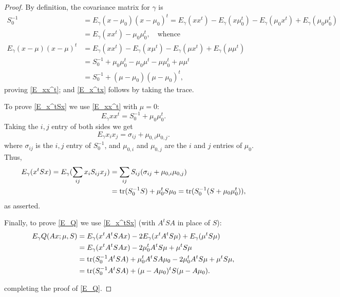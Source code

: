 \documentclass[12pt,leqno]{article}
\begin{document}
  \begin{proof}
    By definition, the covariance matrix for $\gamma$ is
    \begin{align*}
    S_0^{-1} &= E_{\gamma}(x-\mu_0)(x-\mu_0)^t = E_{\gamma}(xx^t) - E_{\gamma}(x\mu_0^t) - E_{\gamma}(\mu_0{x}^t) + E_{\gamma}(\mu_0\mu_0^t)\\
    &= E_{\gamma}(xx^t) - \mu_0\mu_0^t, \quad\text{whence}\\
    E_{\gamma}(x-\mu)(x-\mu)^t &= E_{\gamma}(xx^t) - E_{\gamma}(x\mu^t) - E_{\gamma}(\mu{x}^t) + E_{\gamma}(\mu\mu^t) \\
    &= S_0^{-1} + \mu_0\mu_0^t - \mu_0\mu^t-\mu\mu_0^t + \mu\mu^t\\
    &= S_0^{-1} + (\mu-\mu_0)(\mu-\mu_0)^t,
    \end{align*}
    proving \eqref{E_xx^t}; and \eqref{E_x^tx} follows by taking the trace.

    To prove \eqref{E_x^tSx} we use \eqref{E_xx^t} with $\mu = 0$:
    $$
    E_{\gamma}xx^t = S_0^{-1} + \mu_0\mu_0^t.
    $$
    Taking the $i,j$ entry of both sides we get
    \begin{equation}\label{Ex_ix_}
      E_{\gamma}x_ix_j = \sigma_{ij} + \mu_{0,i}\mu_{0,j}.
    \end{equation}
    where $\sigma_{ij}$ is the $i,j$ entry of $S_0^{-1}$, and $\mu_{0,i}$ and  $\mu_{0,j}$ are the $i$ and $j$ entries
    of $\mu_0$.
    Thus,
    \begin{align*}
      E_{\gamma}(x^tSx) = E_{\gamma}(\sum_{ij}x_iS_{ij}x_j) &= \sum_{ij}S_{ij}(\sigma_{ij} + \mu_{0,i}\mu_{0,j}) \\
                                                            &= \text{\rm tr}(S_0^{-1}S) + \mu_0^tS\mu_0 = \text{\rm tr}(S_0^{-1}(S+\mu_0\mu_0^t)),
    \end{align*}
    as asserted.
    


    Finally, to prove \eqref{E_Q} we  use \eqref{E_x^tSx} (with $A^tSA$ in place of $S$):
      \begin{align*}
        E_{\gamma}Q(Ax;\mu,S) &= E_{\gamma}(x^tA^tSAx) - 2E_{\gamma}(x^tA^tS\mu) + E_{\gamma}(\mu^tS\mu) \\
        &= E_{\gamma}(x^tA^tSAx) - 2\mu_0^tA^tS\mu + \mu^tS\mu\\
        &= \text{\rm tr}(S_0^{-1}A^tSA) + \mu_0^tA^tSA\mu_0 - 2\mu_0^tA^tS\mu + \mu^tS\mu,\\
        &= \text{\rm tr}(S_0^{-1}A^tSA) + (\mu-A\mu_0)^tS(\mu- A\mu_0). 
      \end{align*}

completing the proof of \eqref{E_Q}.
  \end{proof}
  
\end{document}
